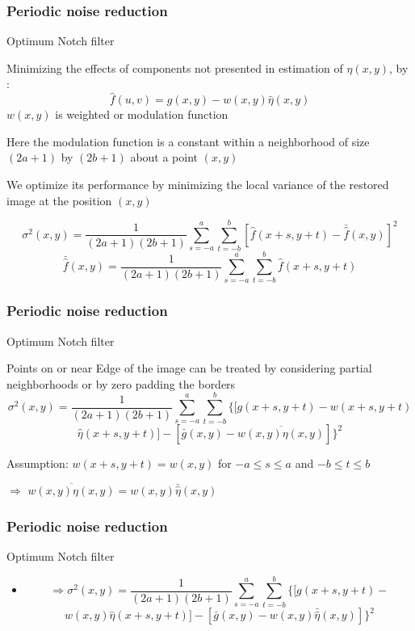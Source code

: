 \documentclass{beamer}
\begin{document}
\begin{frame}
\frametitle{Periodic noise reduction}
\begin{block}{Optimum Notch filter}
\begin{itemize}
\scriptsize{
\item Minimizing the effects of components not presented in estimation of $\eta(x,y)$, by : 
$$ \hat{f}(u,v) = g(x,y) -w(x,y)\hat{\eta}(x,y)$$
\noindent $w(x,y)$ is weighted or modulation function
\item Here the modulation function is a constant within a neighborhood of size $(2a+1)$ by $(2b+1)$ about a point $(x,y)$
\item We optimize its performance by minimizing the local variance of the restored image at the position $(x,y)$

$$\sigma^{2}(x,y) = \frac{1}{(2a+1)(2b+1)} \sum^{a}_{s=-a} \sum^{b}_{t=-b}[\hat{f}(x+s,y+t) - \bar{\hat{f}}(x,y)]^2 $$
$$\bar{\hat{f}}(x,y) = \frac{1}{(2a+1)(2b+1)} \sum^{a}_{s=-a} \sum^{b}_{t=-b} \hat{f}(x+s,y+t)$$
}
\end{itemize}
\end{block}
\end{frame}
\begin{frame}
\frametitle{Periodic noise reduction}
\begin{block}{Optimum Notch filter}
\begin{itemize}
\scriptsize{
\item Points on or near Edge of the image can be treated by considering partial neighborhoods or by zero padding the borders
$$\sigma^{2}(x,y) = \frac{1}{(2a+1)(2b+1)} \sum^{a}_{s=-a} \sum^{b}_{t=-b}\lbrace [g(x+s,y+t)-w(x+s,y+t)$$
$$\hat{\eta}(x+s,y+t)]- [\bar{g}(x,y) - \overline{w(x,y)\eta(x,y)}]\rbrace^2$$
\item Assumption: $w(x+s, y+t) = w(x,y)$ for $-a \leq s \leq a$ and $-b \leq t \leq b$
\item[] $\Rightarrow$  $\overline{w(x,y)\eta(x,y)} = w(x,y)\bar{\hat{\eta}}(x,y)$
}
\end{itemize}
\end{block}
\end{frame}
\begin{frame}
\frametitle{Periodic noise reduction}
\begin{block}{Optimum Notch filter}
\begin{itemize}
\item [] 
$$ \Rightarrow \sigma^{2}(x,y) = \frac{1}{(2a+1)(2b+1)} \sum^{a}_{s=-a} \sum^{b}_{t=-b}\lbrace [g(x+s,y+t)- $$
$$w(x,y)\hat{\eta}(x+s,y+t)]- [\bar{g}(x,y) - w(x,y)\bar{\hat{\eta}}(x,y)]\rbrace^2$$
\end{itemize}
\end{block}
\end{frame}
\end{document}
